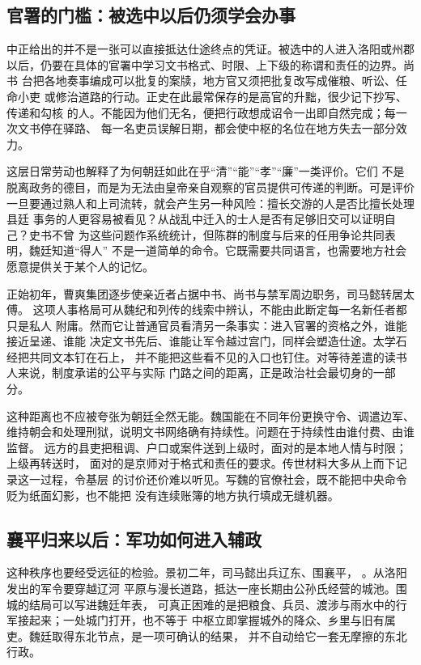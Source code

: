 \subsection{官署的门槛：被选中以后仍须学会办事}

中正给出的并不是一张可以直接抵达仕途终点的凭证。被选中的人进入洛阳或州郡
以后，仍要在具体的官署中学习文书格式、时限、上下级的称谓和责任的边界。尚书
台把各地奏事编成可以批复的案牍，地方官又须把批复改写成催粮、听讼、任命小吏
或修治道路的行动。正史在此最常保存的是高官的升黜，很少记下抄写、传递和勾核
的人。不能因为他们无名，便把行政想成诏令一出即自然完成；每一次文书停在驿路、
每一名吏员误解日期，都会使中枢的名位在地方失去一部分效力。

这层日常劳动也解释了为何朝廷如此在乎“清”“能”“孝”“廉”一类评价。它们
不是脱离政务的德目，而是为无法由皇帝亲自观察的官员提供可传递的判断。可是评价
一旦要通过熟人和上司流转，就会产生另一种风险：擅长交游的人是否比擅长处理县廷
事务的人更容易被看见？从战乱中迁入的士人是否有足够旧交可以证明自己？史书不曾
为这些问题作系统统计，但陈群的制度与后来的任用争论共同表明，魏廷知道“得人”
不是一道简单的命令。它既需要共同语言，也需要地方社会愿意提供关于某个人的记忆。

正始初年，曹爽集团逐步使亲近者占据中书、尚书与禁军周边职务，司马懿转居太傅。
这项人事格局可从魏纪和列传的线索中辨认，不能由此断定每一名新任者都只是私人
附庸。然而它让普通官员看清另一条事实：进入官署的资格之外，谁能接近呈递、谁能
决定文书先后、谁能让军令越过宫门，同样会塑造仕途。太学石经把共同文本钉在石上，
并不能把这些看不见的入口也钉住。对等待差遣的读书人来说，制度承诺的公平与实际
门路之间的距离，正是政治社会最切身的一部分。

这种距离也不应被夸张为朝廷全然无能。魏国能在不同年份更换守令、调遣边军、
维持朝会和处理刑狱，说明文书网络确有持续性。问题在于持续性由谁付费、由谁监督。
远方的县吏把租调、户口或案件送到上级时，面对的是本地人情与时限；上级再转送时，
面对的是京师对于格式和责任的要求。传世材料大多从上而下记录这一过程，令基层
的讨价还价难以听见。写魏的官僚社会，既不能把中央命令贬为纸面幻影，也不能把
没有连续账簿的地方执行填成无缝机器。
\subsection{襄平归来以后：军功如何进入辅政}

这种秩序也要经受远征的检验。景初二年，司马懿出兵辽东、围襄平，
。从洛阳发出的军令要穿越辽河
平原与漫长道路，抵达一座长期由公孙氏经营的城池。围城的结局可以写进魏廷年表，
可真正困难的是把粮食、兵员、渡涉与雨水中的行军接起来；一处城门打开，也不等于
中枢立即掌握城外的降众、乡里与旧有属吏。魏廷取得东北节点，是一项可确认的结果，
并不自动给它一套无摩擦的东北行政。

